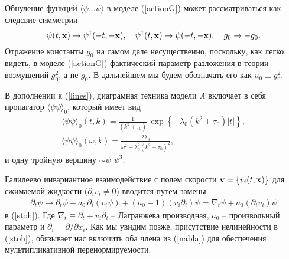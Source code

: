\documentclass[a4paper,10pt]{article}
\def\bfx{{\bf x}}
\def\bfx{{\bf x}}
\begin{document}
Обнуление функций $\langle \psi \dots \psi \rangle$
в моделе (\ref{actionG}) может рассматриваться как следсвие симметрии 
\begin{equation}
\psi(t,{\bf x})\to \psi^{\dagger}(-t,-{\bf x}),
\quad \psi^{\dagger}(t,{\bf x})\to \psi(-t,-{\bf x}),
\quad g_{0}\to -g_{0}.
\label{symm}
\end{equation}
Отражение константы   $g_{0}$ на самом деле несущественно, поскольку, как легко видеть, в моделе  (\ref{actionG})
фактический параметр разложения в теории возмущений $g_{0}^{2}$, а не $g_{0}$. В дальнейшем мы будем обозначать его как $u_{0}\equiv g_{0}^{2}$.


В дополнении к (\ref{lines}), диаграмная техника модели {\it A}
включает в себя пропагатор $\langle \psi \psi \rangle_{0}$, который имеет вид
\begin{eqnarray}
\langle \psi \psi \rangle_{0}(t,k) = \frac{1}{(k^{2}+\tau_{0})}\,
\exp \left\{ - \lambda_{0} (k^{2}+\tau_{0})|t| \right\},
\nonumber \\
\langle \psi \psi \rangle_{0}(\omega,k) = \frac{2\lambda_{0}}
{\omega^{2} + \lambda_{0}^{2} (k^{2}+\tau_{0})^{2}},
\label{lines2}
\end{eqnarray}
и одну тройную вершину $\sim \psi^{\dagger}\psi^{3}$.

Галилеево инвариантное взаимодействие с полем скорости
${\bf v}= \{ v_{i}(t,\bfx) \}$ для сжимаемой жидкости
($\partial _i v_{i} \ne 0$) вводится путем замены
\begin{eqnarray}
\partial_{t}\psi \to \partial_{t}\psi + a_{0}\, \partial_{i}(v_{i}\psi) +
(a_{0}-1) (v_{i} \partial_{i})\psi =
\nabla_{t} \psi + a_{0}(\partial_{i}v_{i}) \psi
\label{nabla}
\end{eqnarray}
в (\ref{stoh}). Где $\nabla_{t} \equiv \partial_{t} + v_{i} \partial_{i}$
-- Лагранжева производная, $a_{0}$ -- произвольный параметр и
$\partial_i = \partial /\partial x_{i}$. 
Как мы увидим позже,  присутствие нелинейности в (\ref{stoh}), обязывает нас включить оба члена из 
(\ref{nabla}) для обеспечения мультипликативной перенормируемости.
\end{document}
